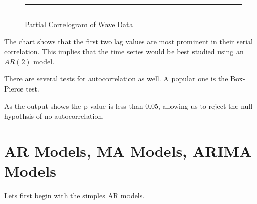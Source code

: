 \documentclass[11pt, letterpaper, twoside]{memoir}\usepackage{knitr}
\begin{document}
\begin{figure}
\centering
\rule{4in}{1pt}
\begin{knitrout}
\color{fgcolor}\begin{kframe}
\begin{alltt}
 \hlstd{=}\hlstd{)}
\end{alltt}


{\ttfamily\noindent\bfseries{}}\end{kframe}
\end{knitrout}
\caption{Partial Correlogram of Wave Data}
\label{Fig:parcorrwave}
\rule{4in}{1pt}
\end{figure}

The chart shows that the first two lag values are most prominent in their serial correlation. This implies that the time series would be best studied using an $AR(2)$ model.

There are several tests for autocorrelation as well. A popular one is the Box-Pierce test.
\begin{knitrout}
\color{fgcolor}\begin{kframe}
\begin{alltt}
\end{alltt}


{\ttfamily\noindent\bfseries\color{errorcolor}{\#\# Error in NCOL(x): object 'wave' not found}}\end{kframe}
\end{knitrout}

As the output shows the p-value is less than 0.05, allowing us to reject the null hypothsis of no autocorrelation.

\section{AR Models, MA Models, ARIMA Models}

Lets first begin with the simples AR models.
\end{document}
